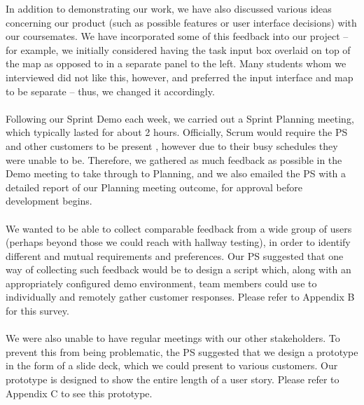\documentclass[a4paper, 10pt]{report}
\begin{document}
In addition to demonstrating our work, we have also discussed various ideas concerning our product (such as possible features or user interface decisions) with our coursemates. We have incorporated some of this feedback into our project -- for example, we initially considered having the task input box overlaid on top of the map as opposed to in a separate panel to the left. Many students whom we interviewed did not like this, however, and preferred the input interface and map to be separate -- thus, we changed it accordingly.\\\\
Following our Sprint Demo each week, we carried out a Sprint Planning meeting, which typically lasted for about 2 hours. Officially, Scrum would require the PS and other customers to be present \cite{scrum-meetings}, however due to their busy schedules they were unable to be. Therefore, we gathered as much feedback as possible in the Demo meeting to take through to Planning, and we also emailed the PS with a detailed report of our Planning meeting outcome, for approval before development begins.\\\\
We wanted to be able to collect comparable feedback from a wide group of users (perhaps beyond those we could reach with hallway testing), in order to identify different and mutual requirements and preferences. Our PS suggested that one way of collecting such feedback would be to design a script which, along with an appropriately configured demo environment, team members could use to individually and remotely gather customer responses. Please refer to Appendix B for this survey.
\\\\
We were also unable to have regular meetings with our other stakeholders. To prevent this from being problematic, the PS suggested that we design a prototype in the form of a slide deck, which we could present to various customers. Our prototype is designed to show the entire length of a user story. Please refer to Appendix C to see this prototype.
\end{document}
